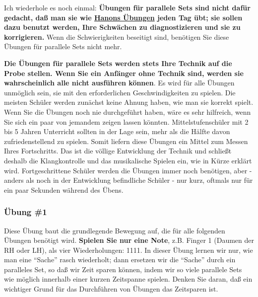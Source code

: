 Ich wiederhole es noch einmal: \textbf{Übungen für parallele Sets sind nicht dafür gedacht, daß man sie wie \hyperlink{c1iii7h}{Hanons Übungen} jeden Tag übt; sie sollen dazu benutzt werden, Ihre Schwächen zu diagnostizieren und sie zu korrigieren.}
Wenn die Schwierigkeiten beseitigt sind, benötigen Sie diese Übungen für parallele Sets nicht mehr.

\textbf{Die Übungen für parallele Sets werden stets Ihre Technik auf die Probe stellen.
Wenn Sie ein Anfänger ohne Technik sind, werden sie wahrscheinlich alle nicht ausführen können}.
Es wird für alle Übungen unmöglich sein, sie mit den erforderlichen Geschwindigkeiten zu spielen.
Die meisten Schüler werden zunächst keine Ahnung haben, wie man sie korrekt spielt.
Wenn Sie die Übungen noch nie durchgeführt haben, wäre es sehr hilfreich, wenn Sie sich ein paar von jemandem zeigen lassen könnten.
Mittelstufenschüler mit 2 bis 5 Jahren Unterricht sollten in der Lage sein, mehr als die Hälfte davon zufriedenstellend zu spielen.
Somit liefern diese Übungen ein Mittel zum Messen Ihres Fortschritts.
Das ist die völlige Entwicklung der Technik und schließt deshalb die Klangkontrolle und das musikalische Spielen ein, wie in Kürze erklärt wird.
Fortgeschrittene Schüler werden die Übungen immer noch benötigen, aber - anders als noch in der Entwicklung befindliche Schüler - nur kurz, oftmals nur für ein paar Sekunden während des Übens.


\subsubsection{Übung \#1}\hypertarget{c1iii7b1}{}

Diese Übung baut die grundlegende Bewegung auf, die für alle folgenden Übungen benötigt wird.
\textbf{Spielen Sie nur eine Note}, z.B. Finger 1 (Daumen der RH oder LH), als vier Wiederholungen: 1111.
In dieser Übung lernen wir nur, wie man eine \enquote{Sache} rasch wiederholt; dann ersetzen wir die \enquote{Sache} durch ein paralleles Set, so daß wir Zeit sparen können, indem wir so viele parallele Sets wie möglich innerhalb einer kurzen Zeitspanne spielen.
Denken Sie daran, daß ein wichtiger Grund für das Durchführen von Übungen das Zeitsparen ist.

